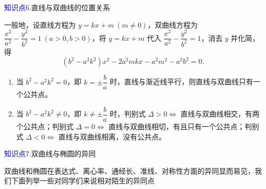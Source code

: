 \documentclass{article}
\begin{document}
\textcolor{blue}{知识点6.}直线与双曲线的位置关系
\vspace{1\baselineskip}

\noindent 一般地，设直线方程为 $y = kx + m\ (m \neq 0)$，双曲线方程为 $\dfrac{x^2}{a^2} - \dfrac{y^2}{b^2} = 1\ (a>0,b>0)$，将 $y = kx + m$ 代入 $\dfrac{x^2}{a^2} - \dfrac{y^2}{b^2} = 1$，消去 $y$ 并化简，得
$$(b^2 - a^2k^2)x^2 - 2a^2mkx - a^2m^2 - a^2b^2 = 0.$$

\begin{enumerate}
    \renewcommand{\labelenumi}{\textcircled{\arabic{enumi}}}
    \item 当 $b^2 - a^2k^2 = 0$，即 $k = \pm \dfrac{b}{a}$ 时，直线与渐近线平行，则直线与双曲线只有一个公共点。
    \item 当 $b^2 - a^2k^2 \neq 0$，即 $k \neq \pm \dfrac{b}{a}$ 时，判别式 $\Delta > 0 \Leftrightarrow$ 直线与双曲线相交，有两个公共点；判别式 $\Delta = 0 \Leftrightarrow$ 直线与双曲线相切，有且只有一个公共点；判别式 $\Delta < 0 \Leftrightarrow$ 直线与双曲线相离，没有公共点。
\end{enumerate}
\vspace{1\baselineskip}

\textcolor{blue}{知识点7.}双曲线与椭圆的异同
\vspace{1\baselineskip}

双曲线和椭圆在表达式、离心率、通经长、准线、对称性方面的异同显而易见，我们下面列举一些对同学们来说相对陌生的异同点
\vspace{1\baselineskip}
\end{document}

